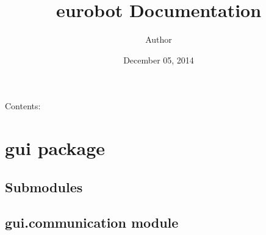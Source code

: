 \documentclass[letterpaper,10pt,english]{sphinxmanual}
\title{eurobot Documentation}
\date{December 05, 2014}
\author{Author}
\begin{document}
\maketitle
\tableofcontents
{}\label{index::doc}


Contents:


\chapter{gui package}
\label{gui:gui-package}\label{gui:welcome-to-eurobot-s-documentation}\label{gui::doc}

\section{Submodules}
\label{gui:submodules}

\section{gui.communication module}
\label{gui:gui-communication-module}\label{gui:module-gui.communication}
\end{document}
